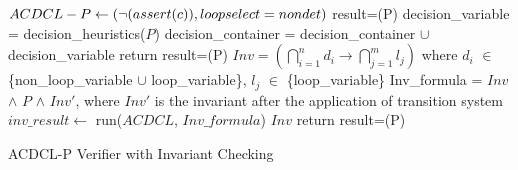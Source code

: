 \documentclass[a4paper,conference]{llncs}
\begin{document}
\begin{algorithm2e}[t]
\DontPrintSemicolon
{}
\begin{small}
$ACDCL-P \leftarrow (\neg(assert(c)),loopselect=nondet)$ \;
\assign result=\deduce(P)\;
 {
  \return \safe \;
}
\uElse
{
   {
    \return \unsafe \;
  }
}
{
  \assign decision\_variable = decision\_heuristics($P$)\;
  \assign decision\_container = decision\_container $\cup$ decision\_variable\; 
  {
    return \unknown\; 
  }
  \uElse
  {
    \assign result=\deduce(P)\;
    {
       {
        \return \unsafe \;
      }
      \uElse 
      {
        \continue\;
      }
    }
    \uElse
    {
       {
         {
          \assign $Inv=(\bigcap_{i=1}^{n} d_{i} \rightarrow
              \bigcap_{j=1}^{m} l_{j})$ where $d_i$ $\in$ \{non\_loop\_variable 
            $\cup$ loop\_variable\}, $l_j$ $\in$ \{loop\_variable\} \;
            \assign Inv\_formula = $Inv$ $\wedge$ $P$ $\wedge$ $Inv'$, where $Inv'$
            is the invariant after the application of transition system\;
        $inv\_result \leftarrow$ run($ACDCL$, $Inv\_formula$) \; 
         {
          \learn $Inv$ \;
        }
        }
         {
          return \safe \;  
        }
        \assign result=\deduce(P)\;
      }
    }
  }
}
\end{small}
\caption{ACDCL-P Verifier with Invariant Checking\label{Alg:verifox}}
\end{algorithm2e}
\end{document}
